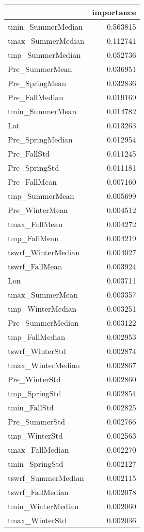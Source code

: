 \begin{tabular}{lr}
\toprule
 & importance \\
\midrule
tmin_SummerMedian & 0.563815 \\
tmax_SummerMedian & 0.112741 \\
tmp_SummerMedian & 0.052736 \\
Pre_SummerMean & 0.036951 \\
Pre_SpringMean & 0.032836 \\
Pre_FallMedian & 0.019169 \\
tmin_SummerMean & 0.014782 \\
Lat & 0.013263 \\
Pre_SpringMedian & 0.012954 \\
Pre_FallStd & 0.011245 \\
Pre_SpringStd & 0.011181 \\
Pre_FallMean & 0.007160 \\
tmp_SummerMean & 0.005699 \\
Pre_WinterMean & 0.004512 \\
tmax_FallMean & 0.004272 \\
tmp_FallMean & 0.004219 \\
tswrf_WinterMedian & 0.004027 \\
tswrf_FallMean & 0.003924 \\
Lon & 0.003711 \\
tmax_SummerMean & 0.003357 \\
tmp_WinterMedian & 0.003251 \\
Pre_SummerMedian & 0.003122 \\
tmp_FallMedian & 0.002953 \\
tswrf_WinterStd & 0.002874 \\
tmax_WinterMedian & 0.002867 \\
Pre_WinterStd & 0.002860 \\
tmp_SpringStd & 0.002854 \\
tmin_FallStd & 0.002825 \\
Pre_SummerStd & 0.002766 \\
tmp_WinterStd & 0.002563 \\
tmax_FallMedian & 0.002270 \\
tmin_SpringStd & 0.002127 \\
tswrf_SummerMedian & 0.002115 \\
tswrf_FallMedian & 0.002078 \\
tmin_WinterMedian & 0.002060 \\
tmax_WinterStd & 0.002036 \\

\end{tabular}
